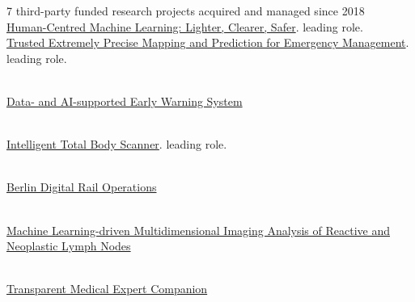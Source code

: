 
\ifdefined\shortcv
    {\hspace*{\fill} 7 third-party funded research projects acquired and managed since 2018}
\else
    {
        \\
        \href{https://www.hhi.fraunhofer.de/en/departments/ai/projects/achilles.html}{
        Human-Centred Machine Learning: Lighter, Clearer, Safer}. leading role.
    }
    {
        \\
        \href{https://www.hhi.fraunhofer.de/en/departments/ai/projects/tema.html}{
                        Trusted Extremely Precise Mapping
                    and Prediction for Emergency Management}. leading role.
    }

    {
        \\
        \href{https://www.hhi.fraunhofer.de/en/departments/ai/projects/daki-fws.html}{Data- and AI-supported Early Warning System}
    }

    {
        \\
        \href{https://www.hhi.fraunhofer.de/en/departments/ai/projects/itobos.html}{ Intelligent Total Body Scanner}. leading role.
    }

    {
        \\
        \href{https://www.hhi.fraunhofer.de/en/departments/ai/projects/berdiba.html}{Berlin Digital Rail Operations}
    }

    {
        \\
        \href{https://www.hhi.fraunhofer.de/en/departments/ai/projects/patho234.html}{
                     Machine Learning-driven Multidimensional Imaging Analysis
                    of Reactive  and Neoplastic Lymph Nodes}
    }

    {
        \\
        \href{https://www.hhi.fraunhofer.de/en/departments/ai/projects/trameexco.html}{Transparent Medical Expert Companion}
    }


\fi
